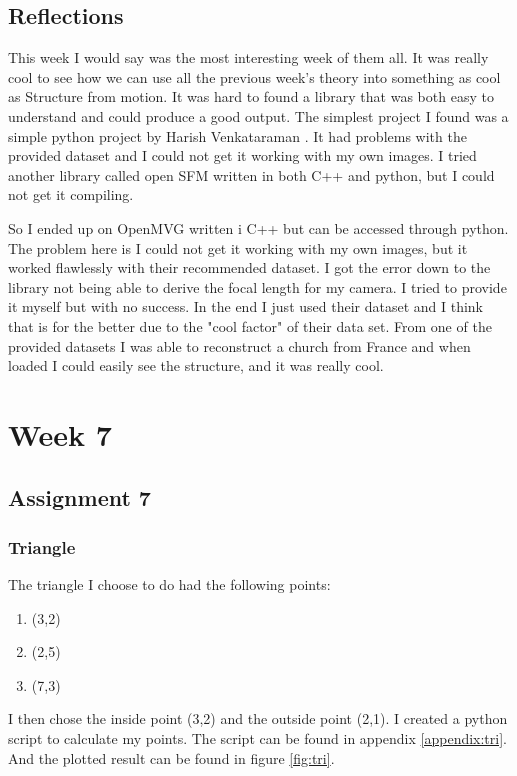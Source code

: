 \documentclass{article}
\begin{document}
\subsection{Reflections}
This week I would say was the most interesting week of them all. It was really cool to see how we can use all the previous week's theory into something as cool as Structure from motion. It was hard to found a library that was both easy to understand and could produce a good output. The simplest project I found was a simple python project by Harish Venkataraman \cite{SFMGit}. It had problems with the provided dataset and I could not get it working with my own images. I tried another library called open SFM written in both C++ and python, but I could not get it compiling. 

So I ended up on OpenMVG written i C++ but can be accessed through python. The problem here is I could not get it working with my own images, but it worked flawlessly with their recommended dataset. I got the error down to the library not being able to derive the focal length for my camera. I tried to provide it myself but with no success. In the end I just used their dataset and I think that is for the better due to the "cool factor" of their data set. From one of the provided datasets I was able to reconstruct a church from France and when loaded I could easily see the structure, and it was really cool. 

\section{Week 7}
\subsection{Assignment 7}
\subsubsection{Triangle}
The triangle I choose to do had the following points:
\begin{enumerate}
    \item (3,2)
    \item (2,5)
    \item (7,3)
\end{enumerate}
I then chose the inside point (3,2) and the outside point (2,1). I created a python script to calculate my points. The script can be found in appendix \ref{appendix:tri}. And the plotted result can be found in figure \ref{fig:tri}.
\end{document}
